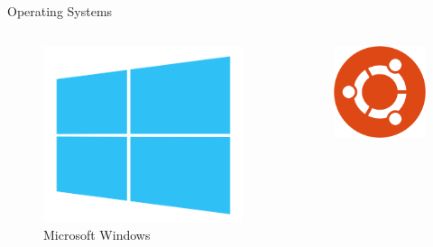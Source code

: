 \documentclass[10pt]{beamer}
\begin{document}
    \begin{frame}{Operating Systems}
        \begin{columns}
            \begin{column}{0.5\textwidth}
                \begin{figure}
                    \includegraphics[height=0.3\paperheight]{images/windows}
                    \caption{Microsoft Windows}
                \end{figure}
            \end{column}
            \vrule{}
            \begin{column}{0.5\textwidth}
                \begin{figure}
                    \includegraphics[height=0.12\paperheight]{images/ubuntu}

\end{figure}
\end{column}
\end{columns}
\end{frame}
\end{document}
